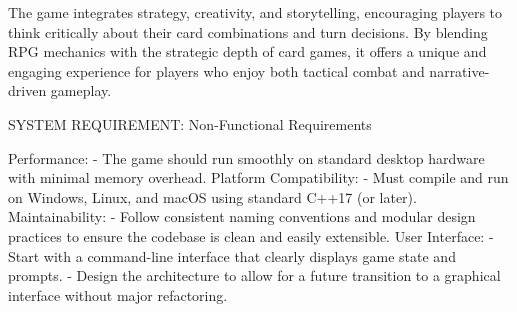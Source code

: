 The game integrates strategy, creativity, and storytelling, encouraging players to think critically about their card combinations and turn decisions. By blending RPG mechanics with the strategic depth of card games, it offers a unique and engaging experience for players who enjoy both tactical combat and narrative-\/driven gameplay.



SYSTEM REQUIREMENT\+: Non-\/\+Functional Requirements

Performance\+: -\/ The game should run smoothly on standard desktop hardware with minimal memory overhead. Platform Compatibility\+: -\/ Must compile and run on Windows, Linux, and mac\+OS using standard C++17 (or later). Maintainability\+: -\/ Follow consistent naming conventions and modular design practices to ensure the codebase is clean and easily extensible. User Interface\+: -\/ Start with a command-\/line interface that clearly displays game state and prompts. -\/ Design the architecture to allow for a future transition to a graphical interface without major refactoring. 